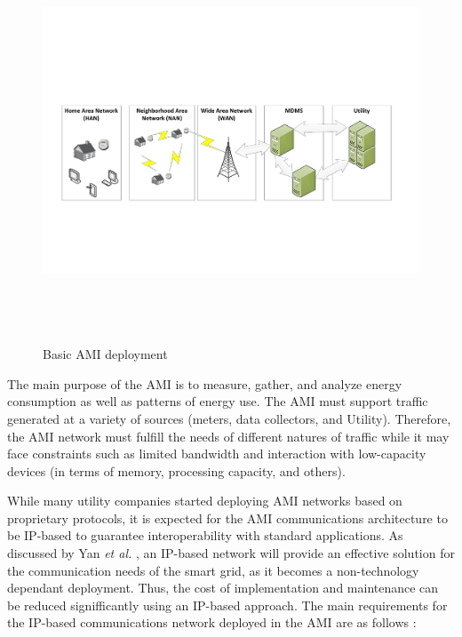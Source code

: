 \documentclass[11pt,draftclsnofoot,onecolumn]{IEEEtran}
\begin{document}
\begin{figure}[htp!]
\centering
\includegraphics [height=12cm] {AMIArchitecture}
\caption{Basic AMI deployment}
\label{fig:ami}
\end{figure}

The main purpose of the AMI is to measure, gather, and analyze energy consumption as well as patterns of energy use.  The AMI must support  traffic generated at a variety of sources (meters, data collectors, and Utility). Therefore, the AMI network must fulfill %
the needs of different natures of traffic while it may face constraints such as limited bandwidth and interaction with low-capacity devices (in terms of memory, processing capacity, and others).

While many utility companies started deploying AMI networks based on proprietary protocols, it is expected for the AMI communications architecture to be IP-based to guarantee interoperability with standard applications. As discussed by Yan \textit{et al.} \cite{Yan2013}, an IP-based network will provide an effective solution for the communication needs of the smart grid, as it becomes a non-technology dependant deployment.  Thus, the cost of implementation and maintenance can be reduced signifficantly using an IP-based approach. The main requirements for the IP-based communications network deployed in the AMI are as follows \cite{Wang2011b} \cite{Iyer2011a}:
\end{document}
